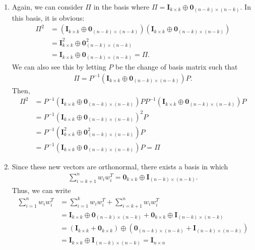 \documentclass{article}
\begin{document}
\begin{enumerate}
\begin{enumerate}
        \item Again, we can consider $\Pi$ in the basis where $\Pi = \mathbf{I}_{k \times k} \oplus \mathbf{0}_{(n-k) \times (n-k)}$.
        In this basis, it is obvious:
        \begin{align*}
            \Pi^2 
            &= (\mathbf{I}_{k \times k} \oplus \mathbf{0}_{(n-k) \times (n-k)})
            (\mathbf{I}_{k \times k} \oplus \mathbf{0}_{(n-k) \times (n-k)}) \\
            &= \mathbf{I}_{k \times k}^2 \oplus \mathbf{0}_{(n-k) \times (n-k)}^2 \\
            &= \mathbf{I}_{k \times k} \oplus \mathbf{0}_{(n-k) \times (n-k)} = \Pi.
        \end{align*}
        We can also see this by letting $P$ be the change of basis matrix such that 
        \begin{align*}
            \Pi = 
            P^{-1} (\mathbf{I}_{k \times k} \oplus \mathbf{0}_{(n-k) \times (n-k)}) P.
        \end{align*}
        Then, 
        \begin{align*}
            \Pi^2 &= 
            P^{-1} (\mathbf{I}_{k \times k} \oplus \mathbf{0}_{(n-k) \times (n-k)}) P
            P^{-1} (\mathbf{I}_{k \times k} \oplus \mathbf{0}_{(n-k) \times (n-k)}) P \\
            &= 
            P^{-1} (\mathbf{I}_{k \times k} \oplus \mathbf{0}_{(n-k) \times (n-k)})^2 P \\
            &= P^{-1} (\mathbf{I}_{k \times k}^2 \oplus \mathbf{0}_{(n-k) \times (n-k)}^2) P \\
            &= P^{-1} (\mathbf{I}_{k \times k} \oplus \mathbf{0}_{(n-k) \times (n-k)}) P
            = \Pi
        \end{align*}

        \item Since these new vectors are orthonormal, there exists a basis in which
        \begin{align*}
            \sum_{i=k+1}^n w_i w_i^T 
            = \mathbf{0}_{k \times k} \oplus \mathbf{I}_{(n-k) \times (n-k)}.
        \end{align*}
        Thus, we can write
        \begin{align*}
            \sum_{i=1}^n w_i w_i^T 
            &= \sum_{i=1}^k w_i w_i^T + \sum_{i=k+1}^n w_i w_i^T \\
            &= \mathbf{I}_{k \times k} \oplus \mathbf{0}_{(n-k) \times (n-k)}
            + \mathbf{0}_{k \times k} \oplus \mathbf{I}_{(n-k) \times (n-k)} \\
            &= (\mathbf{I}_{k \times k} + \mathbf{0}_{k \times k})
            \oplus (\mathbf{0}_{(n-k) \times (n-k)} + \mathbf{I}_{(n-k) \times (n-k)}) \\
            &= \mathbf{I}_{k \times k} \oplus \mathbf{I}_{(n-k) \times (n-k)} 
            = \mathbf{I}_{n \times n}
        \end{align*}
    \end{enumerate}


\end{enumerate}
\end{document}
